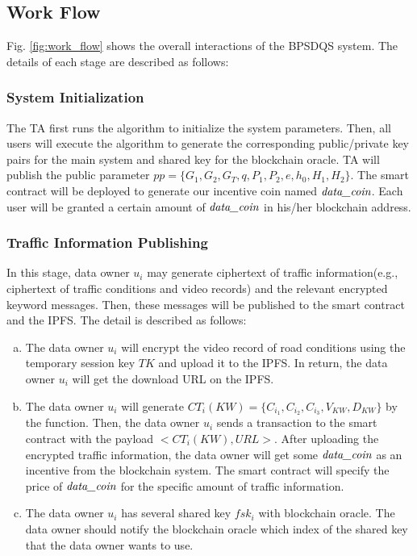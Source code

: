 \documentclass[journal,10pt]{IEEEtran}
\begin{document}
\subsection{Work Flow}
Fig. \ref{fig:work_flow} shows the overall interactions of the BPSDQS system. 
The details of each stage are described as follows:

\subsubsection{\textbf{System Initialization}}
The TA first runs the  algorithm to initialize the system parameters. Then, all users will execute the  algorithm to generate the corresponding public/private key pairs for the main system and shared key for the blockchain oracle. TA will publish the public parameter $pp = \{G_1, G_2, G_T, q, P_1, P_2, e, h_0, H_1, H_2\} $. The smart contract will be deployed to generate our incentive coin named $\emph{data\_coin}$. Each user will be granted a certain amount of $\emph{data\_coin}$ in his/her blockchain address.

\subsubsection{\textbf{Traffic Information Publishing}}
In this stage, data owner $u_i$ may generate ciphertext of traffic information(e.g., ciphertext of traffic conditions and video records) and the relevant encrypted keyword messages. Then, these messages will be published to the smart contract and the IPFS. The detail is described as follows:

\begin{enumerate}[a.]
    
    \item 
    The data owner $u_i$ will encrypt the video record of road conditions using the temporary session key $TK$ and upload it to the IPFS. In return, the data owner $u_i$ will get the download URL on the IPFS.
    
    \item 
    The data owner $u_i$ will generate  $CT_i(KW) = \{C_{i_1}, C_{i_2}, C_{i_3}, V_{KW}, D_{KW}\}$ by the  function. Then, the data owner $u_i$ sends a transaction to the smart contract with the payload $<CT_i(KW), URL>$. After uploading the encrypted traffic information, the data owner will get some $\emph{data\_coin}$ as an incentive from the blockchain system. The smart contract will specify the price of $\emph{data\_coin}$ for the specific amount of traffic information.
    
    \item 
    The data owner $u_i$ has several shared key $fsk_i$ with blockchain oracle. The data owner should notify the blockchain oracle which index of the shared key that the data owner wants to use.
    
\end{enumerate}
\end{document}
